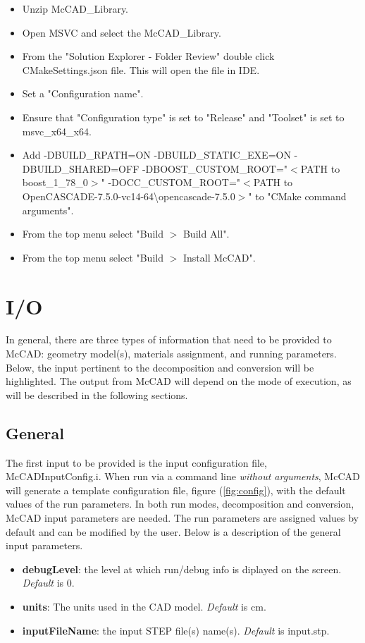 \documentclass[letterpaper, 12 pt]{report}
\begin{document}
\begin{itemize}
\begin{itemize}
		\item Unzip McCAD\_Library.
		\item Open MSVC and select the McCAD\_Library.
		\item From the "Solution Explorer - Folder Review" double click CMakeSettings.json file. This will open the file in IDE. \item Set a "Configuration name". 
		\item Ensure that "Configuration type" is set to "Release" and "Toolset" is set to msvc\_x64\_x64.
		\item Add -DBUILD\_RPATH=ON -DBUILD\_STATIC\_EXE=ON -DBUILD\_SHARED=OFF -DBOOST\_CUSTOM\_ROOT="$<$PATH to boost\_1\_78\_0$>$" -DOCC\_CUSTOM\_ROOT="$<$PATH to OpenCASCADE-7.5.0-vc14-64\textbackslash opencascade-7.5.0$>$" to "CMake command arguments".
		\item From the top menu select "Build $>$ Build All".
		\item From the top menu select "Build $>$ Install McCAD".
	  \end{itemize}
    \end{itemize}

\section{I/O}
In general, there are three types of information that need to be provided to McCAD: geometry model(s), materials assignment, and running parameters. Below, the input pertinent to the decomposition and conversion will be highlighted. The output from McCAD will depend on the mode of execution, as will be described in the following sections.
  \subsection{General}
	The first input to be provided is the input configuration file, McCADInputConfig.i.  When run via a command line \emph{without arguments}, McCAD will generate a template configuration file, figure (\ref{fig:config}), with the default values of the run parameters. In both run modes, decomposition and conversion, McCAD input parameters are needed. The run parameters are assigned values by default and can be modified by the user. Below is a description of the general input parameters.
	\begin{itemize}
		\item \textbf{debugLevel}: the level at which run/debug info is diplayed on the screen. \emph{Default} is 0.
		\item \textbf{units}: The units used in the CAD model. \emph{Default} is cm.
		\item \textbf{inputFileName}: the input STEP file(s) name(s). \emph{Default} is input.stp.
	\end{itemize}
\end{document}
